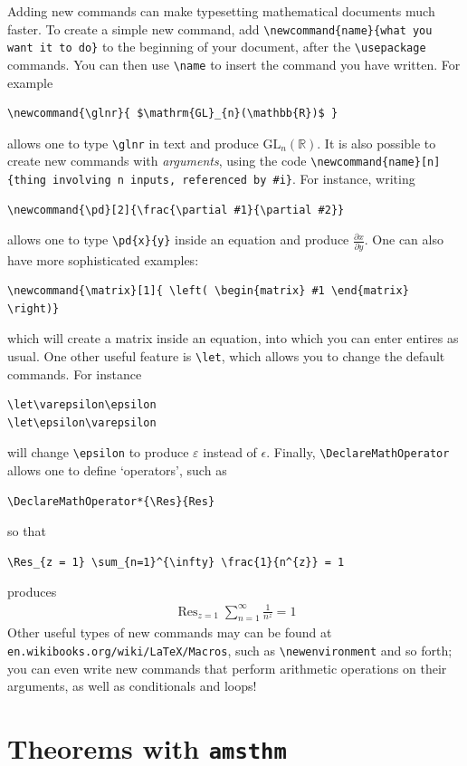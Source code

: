\documentclass[10pt]{article}
\newcommand{\pd}[2]{\frac{\partial #1}{\partial #2}}
\DeclareMathOperator*{\Res}{Res}
\newcommand{\eqn}[1]{\begin{align*} #1 \end{align*}}
\begin{document}
Adding new commands can make typesetting mathematical documents much faster. To create a simple new command, add \verb$\newcommand{name}{what you want it to do}$ to the beginning of your document, after the \verb$\usepackage$ commands. You can then use \verb$\name$ to insert the command you have written. For example
\begin{verbatim}
\newcommand{\glnr}{ $\mathrm{GL}_{n}(\mathbb{R})$ }
\end{verbatim}
allows one to type \verb$\glnr$ in text and produce $\mathrm{GL}_{n}( \mathbb{R})$. It is also possible to create new commands with \textit{arguments}, using the code \verb$\newcommand{name}[n]{thing involving n inputs, referenced by #i}$. For instance, writing
\begin{verbatim}
\newcommand{\pd}[2]{\frac{\partial #1}{\partial #2}}
\end{verbatim}
allows one to type \verb$\pd{x}{y}$ inside an equation and produce $\pd{x}{y}$. One can also have more sophisticated examples:
\begin{verbatim}
\newcommand{\matrix}[1]{ \left( \begin{matrix} #1 \end{matrix} \right)}
\end{verbatim}
which will create a matrix inside an equation, into which you can enter entires as usual. One other useful feature is \verb$\let$, which allows you to change the default commands. For instance
\begin{verbatim}
\let\varepsilon\epsilon
\let\epsilon\varepsilon
\end{verbatim}
will change \verb$\epsilon$ to produce $\varepsilon$ instead of $\epsilon$. Finally, \verb$\DeclareMathOperator$ allows one to define `operators', such as
\begin{verbatim}
\DeclareMathOperator*{\Res}{Res}
\end{verbatim}
so that
\begin{verbatim}
\Res_{z = 1} \sum_{n=1}^{\infty} \frac{1}{n^{z}} = 1
\end{verbatim}
produces
\eqn{
\Res_{z = 1} \sum_{n=1}^{\infty} \frac{1}{n^{z}} = 1
}
Other useful types of new commands may can be found at \texttt{en.wikibooks.org/wiki/LaTeX/Macros}, such as \verb$\newenvironment$ and so forth; you can even write new commands that perform arithmetic operations on their arguments, as well as conditionals and loops!

\section{Theorems with \texttt{amsthm}}
\end{document}
